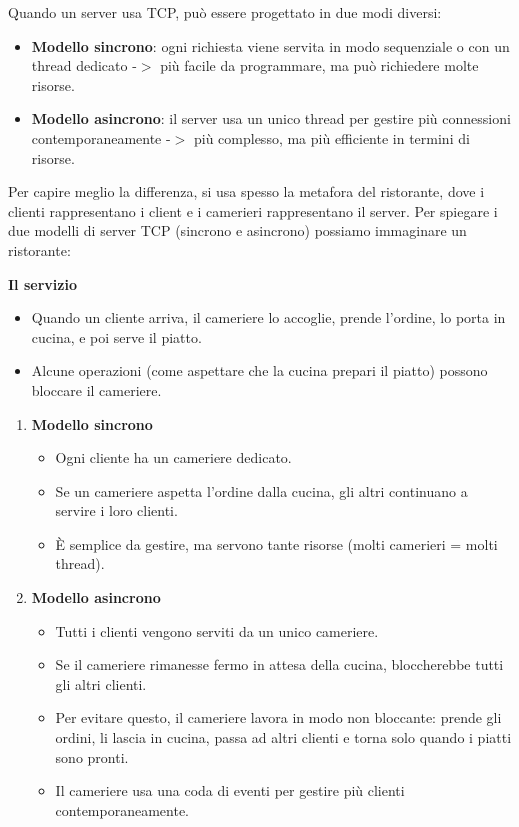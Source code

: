 Quando un server usa TCP, può essere progettato in due modi diversi:
\begin{itemize}
    \item \textbf{Modello sincrono}: ogni richiesta viene servita in modo sequenziale o con un thread dedicato -$>$ più facile da programmare, ma può richiedere molte risorse.
    \item \textbf{Modello asincrono}: il server usa un unico thread per gestire più connessioni contemporaneamente -$>$ più complesso, ma più efficiente in termini di risorse.
\end{itemize}
Per capire meglio la differenza, si usa spesso la metafora del ristorante, dove i clienti rappresentano i client e i camerieri rappresentano il server.\newline
Per spiegare i due modelli di server TCP (sincrono e asincrono) possiamo immaginare un ristorante:
\begin{flushleft}
    \textbf{Il servizio}
    \begin{itemize}
        \item Quando un cliente arriva, il cameriere lo accoglie, prende l’ordine, lo porta in cucina, e poi serve il piatto.
        \item Alcune operazioni (come aspettare che la cucina prepari il piatto) possono bloccare il cameriere.
    \end{itemize}
\end{flushleft}

\begin{enumerate}
    \item \textbf{Modello sincrono}\begin{itemize}
        \item Ogni cliente ha un cameriere dedicato.
        \item Se un cameriere aspetta l’ordine dalla cucina, gli altri continuano a servire i loro clienti.
        \item È semplice da gestire, ma servono tante risorse (molti camerieri = molti thread).
    \end{itemize}
    \item \textbf{Modello asincrono}\begin{itemize}
        \item Tutti i clienti vengono serviti da un unico cameriere.
        \item Se il cameriere rimanesse fermo in attesa della cucina, bloccherebbe tutti gli altri clienti.
        \item Per evitare questo, il cameriere lavora in modo non bloccante: prende gli ordini, li lascia in cucina, passa ad altri clienti e torna solo quando i piatti sono pronti.
        \item Il cameriere usa una coda di eventi per gestire più clienti contemporaneamente.
    \end{itemize}
\end{enumerate}

